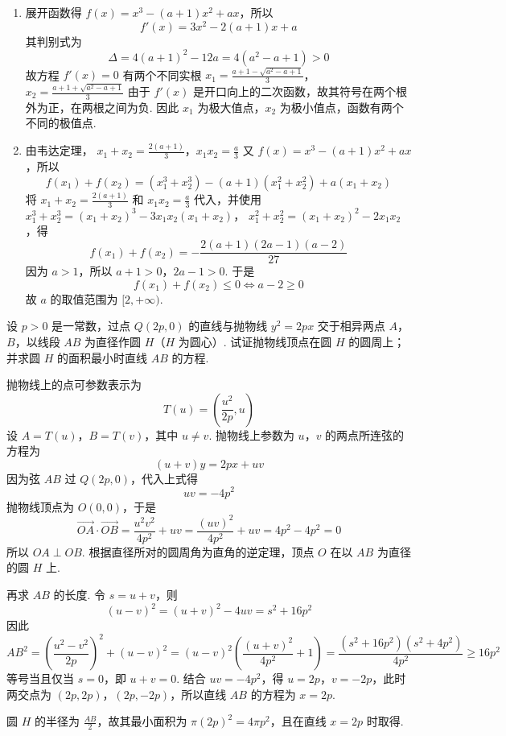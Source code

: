 \begin{solution}
\begin{enumerate}
\item 展开函数得 \(f(x)=x^3-(a+1)x^2+ax\)，所以
\[
f'(x)=3x^2-2(a+1)x+a\]
其判别式为
\[
\Delta=4(a+1)^2-12a=4(a^2-a+1)>0
\]
故方程 \(f'(x)=0\) 有两个不同实根
\(x_1=\frac{a+1-\sqrt{a^2-a+1}}{3}\)，\(x_2=\frac{a+1+\sqrt{a^2-a+1}}{3}\)
由于 \(f'(x)\) 是开口向上的二次函数，故其符号在两个根外为正，在两根之间为负. 因此 \(x_1\) 为极大值点，\(x_2\) 为极小值点，函数有两个不同的极值点.

\item 由韦达定理，
\(x_1+x_2=\frac{2(a+1)}{3}\)，\(x_1x_2=\frac{a}{3}\)
又 \(f(x)=x^3-(a+1)x^2+ax\)，所以
\[
f(x_1)+f(x_2)=(x_1^3+x_2^3)-(a+1)(x_1^2+x_2^2)+a(x_1+x_2)\]
将 \(x_1+x_2=\frac{2(a+1)}{3}\) 和 \(x_1x_2=\frac{a}{3}\) 代入，并使用
\(x_1^3+x_2^3=(x_1+x_2)^3-3x_1x_2(x_1+x_2)\)，
\(x_1^2+x_2^2=(x_1+x_2)^2-2x_1x_2\)，得
\[
f(x_1)+f(x_2)=-\frac{2(a+1)(2a-1)(a-2)}{27}\]
因为 \(a>1\)，所以 \(a+1>0\)，\(2a-1>0\). 于是
\[
f(x_1)+f(x_2)\leqslant0\Longleftrightarrow a-2\geqslant0\]
故 \(a\) 的取值范围为 \([2,+\infty)\).
\end{enumerate}
\end{solution}

\begin{problem}
设 \(p>0\) 是一常数，过点 \(Q(2p,0)\) 的直线与抛物线 \(y^2=2px\) 交于相异两点 \(A\)，\(B\)，以线段 \(AB\) 为直径作圆 \(H\)（\(H\) 为圆心）. 试证抛物线顶点在圆 \(H\) 的圆周上；并求圆 \(H\) 的面积最小时直线 \(AB\) 的方程.
\end{problem}

\begin{solution}
抛物线上的点可参数表示为
\[
T(u)=\left(\frac{u^2}{2p},u\right)\]
设 \(A=T(u)\)，\(B=T(v)\)，其中 \(u\neq v\). 抛物线上参数为 \(u\)，\(v\) 的两点所连弦的方程为
\[
(u+v)y=2px+uv\]
因为弦 \(AB\) 过 \(Q(2p,0)\)，代入上式得
\[
uv=-4p^2\]
抛物线顶点为 \(O(0,0)\)，于是
\[
\overrightarrow{OA}\cdot\overrightarrow{OB}=\frac{u^2v^2}{4p^2}+uv=\frac{(uv)^2}{4p^2}+uv=4p^2-4p^2=0\]
所以 \(OA\perp OB\). 根据直径所对的圆周角为直角的逆定理，顶点 \(O\) 在以 \(AB\) 为直径的圆 \(H\) 上.

再求 \(AB\) 的长度. 令 \(s=u+v\)，则
\[
(u-v)^2=(u+v)^2-4uv=s^2+16p^2\]
因此
\[
AB^2=\left(\frac{u^2-v^2}{2p}\right)^2+(u-v)^2
=(u-v)^2\left(\frac{(u+v)^2}{4p^2}+1\right)
=\frac{(s^2+16p^2)(s^2+4p^2)}{4p^2}\geqslant16p^2\]
等号当且仅当 \(s=0\)，即 \(u+v=0\). 结合 \(uv=-4p^2\)，得 \(u=2p\)，\(v=-2p\)，此时两交点为 \((2p,2p)\)，\((2p,-2p)\)，所以直线 \(AB\) 的方程为 \(x=2p\).

圆 \(H\) 的半径为 \(\frac{AB}{2}\)，故其最小面积为 \(\pi(2p)^2=4\pi p^2\)，且在直线 \(x=2p\) 时取得.
\end{solution}

